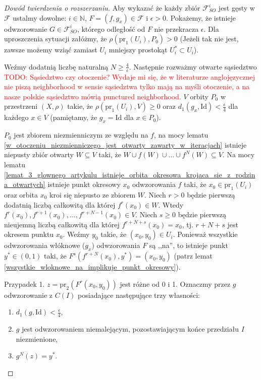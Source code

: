 \documentclass[licencjacka]{pwr_wmat_praca_dyplomowa}
\theoremstyle{plain}
\numberwithin{theorem}{chapter}
\theoremstyle{definition}
\numberwithin{theorem}{chapter}
\begin{document}
\begin{proof}[Dowód twierdzenia o rozszerzaniu]
Aby wykazać że każdy zbiór $\mathcal{F}_{SO}^i$ jest gęsty w $\mathcal{F}$ ustalmy dowolne: $i \in \mathbb{N}$, $F=(f,g_x) \in \mathcal{F}$ i $\epsilon > 0$. Pokażemy, że istnieje odwzorowanie $G \in \mathcal{F}_{SO}^i$, którego odległość od $F$ nie przekracza $\epsilon$. Dla uproszczenia sytuacji załóżmy, że $\rho(\textrm{pr}_1(U_i), P_0) > 0$ (Jeżeli tak nie jest, zawsze możemy wziąć zamiast $U_i$ mniejszy prostokąt $U_i^* \subset U_i$).

Weźmy dodatnią liczbę naturalną $N \geq \frac{4}{\epsilon}$. Następnie rozważmy otwarte sąsiedztwo \textcolor{red}{TODO: Sąsiedztwo czy otoczenie? Wydaje mi się, że w literaturze anglojęzycznej nie piszą neighborhood w sensie sąsiedztwa tylko mają na myśli otoczenie, a na nasze polskie sąsiedztwo mówią punctured neighborhood.} $V$ orbity $P_0$ w przestrzeni $(X, \rho)$ takie, że $\rho(\textrm{pr}_1(U_i), V) \geq 0$ oraz $d_1(g_x, \textrm{Id}) < \frac{\epsilon}{4}$ dla każdego $x \in V$ (pamiętamy, że $g_x = \textrm{Id}$ dla $x \in P_0$).

$P_0$ jest zbiorem niezmienniczym ze względu na $f$, na mocy lematu \ref{w_otoczeniu_niezmienniczego_jest_otwarty_zawarty_w_iteracjach} istnieje niepusty zbiór otwarty $W \subseteq V$ taki, że $W \cup f(W) \cup \ldots \cup f^N(W) \subseteq V$. Na mocy lematu \ref{lemat_3_glownego_artykulu_istnieje_orbita_okresowa_krojaca_sie_z_rodzina_otwartych} istnieje punkt okresowy $x_0$ odwzorowania $f$ taki, że $x_0 \in \textrm{pr}_1(U_i)$ oraz orbita $x_0$ kroi się niepusto ze zbiorem $W$. Niech $r > 0$ będzie pierwszą dodatnią liczbą całkowitą dla której $f^r(x_0) \in W$. Wtedy $f^r(x_0), f^{r+1}(x_0), \ldots, f^{r+N-1}(x_0) \in V$. Niech $s \geq 0$ będzie pierwszą nieujemną liczbą całkowitą dla której $f^{r+N+s}(x_0) = x_0$, tj. $r+N+s$ jest okresem punktu $x_0$. Weźmy $y_0$ takie, że $(x_0, y_0) \in U_i$. Ponieważ wszystkie odwzorowania włóknowe ($g_x$) odwzorowania $F$ są ,,na'', to istnieje punkt $y^* \in (0,1)$ taki, że $F^s(f^{r+N}(x_0), y^*) = (x_0, y_0)$ (patrz lemat \ref{wszystkie_wloknowe_na_implikuje_punkt_okresowy}).

Przypadek 1. $z = \textrm{pr}_2(F^r(x_0, y_0))$ jest różne od 0 i 1.
Oznaczmy przez $g$ odwzorowanie z $C(I)$ posiadające następujące trzy własności:
\begin{enumerate}[label=(g\arabic*)]
\item \label{g_jeden} $d_1(g, \mathrm{Id}) < \frac{\epsilon}{4}$,
\item \label{g_dwa} $g$ jest odwzorowaniem niemalejącym, pozostawiającym końce przedziału $I$ niezmienione,
\item \label{g_trzy} $g^N(z) = y^*$.
\end{enumerate}


\end{proof}
\end{document}
